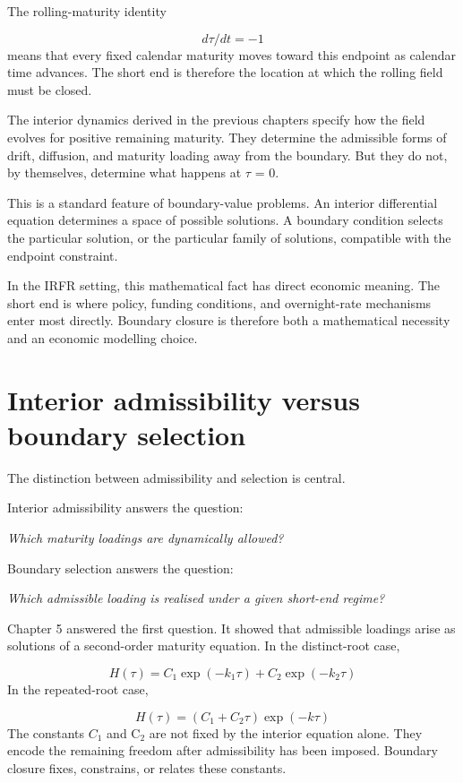 \documentclass[11pt,oneside]{book}
\begin{document}
The rolling-maturity identity

\[
d\tau/dt = -1
\]
means that every fixed calendar maturity moves toward this endpoint as
calendar time advances. The short end is therefore the location at which
the rolling field must be closed.

The interior dynamics derived in the previous chapters specify how the
field evolves for positive remaining maturity. They determine the
admissible forms of drift, diffusion, and maturity loading away from the
boundary. But they do not, by themselves, determine what happens at $\tau$ =
0.

This is a standard feature of boundary-value problems. An interior
differential equation determines a space of possible solutions. A
boundary condition selects the particular solution, or the particular
family of solutions, compatible with the endpoint constraint.

In the IRFR setting, this mathematical fact has direct economic meaning.
The short end is where policy, funding conditions, and overnight-rate
mechanisms enter most directly. Boundary closure is therefore both a
mathematical necessity and an economic modelling choice.

\section{Interior admissibility versus boundary selection}\label{interior-admissibility-versus-boundary-selection}

The distinction between admissibility and selection is central.

Interior admissibility answers the question:

\begin{center}\emph{Which maturity loadings are dynamically allowed?}\end{center}
Boundary selection answers the question:

\emph{Which admissible loading is realised under a given short-end
regime?}

Chapter 5 answered the first question. It showed that admissible
loadings arise as solutions of a second-order maturity equation. In the
distinct-root case,

\[
H(\tau) = C_1 \exp(-k_1\tau) + C_2 \exp(-k_2\tau)
\]
In the repeated-root case,

\[
H(\tau) = (C_1 + C_2\tau) \exp(-k\tau)
\]
The constants $C_1$ and C$_2$ are not fixed by the interior equation alone.
They encode the remaining freedom after admissibility has been imposed.
Boundary closure fixes, constrains, or relates these constants.
\end{document}

